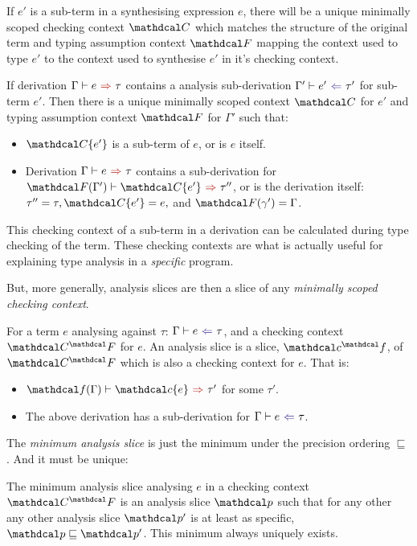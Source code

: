 If $e'$ is a sub-term in a synthesising expression $e$, there will be a unique minimally scoped checking context $\C$ which matches the structure of the original term and typing assumption context $\F$ mapping the context used to type $e'$ to the context used to synthesise $e'$ in it's checking context. 
\begin{proposition}
If derivation $\synthesis{e}{\tau}$ contains a analysis sub-derivation $\analysis[\Gamma']{e'}{\tau'}$ for sub-term $e'$. Then there is a unique minimally scoped context $\C$ for $e'$ and typing assumption context $\F$ for $\Gamma'$ such that:
\begin{itemize}
\item $\C\{e'\}$ is a sub-term of $e$, or is $e$ itself.
\item Derivation $\synthesis{e}{\tau}$ contains a sub-derivation for $\synthesis[\F(\Gamma')]{\C\{e'\}}{\tau''}$, or is the derivation itself: $\tau'' = \tau, \C\{e'\} = e,$ and $\F(\gamma') = \Gamma$.
\end{itemize}
\end{proposition}

This checking context of a sub-term in a derivation can be calculated during type checking of the term. These checking contexts are what is actually useful for explaining type analysis in a \textit{specific} program.

But, more generally, analysis slices are then a slice of any \textit{minimally scoped checking context}.

\begin{definition}\label{def:analysisslice}
For a term $e$ analysing against $\tau$: $\analysis{e}{\tau}$, and a checking context $\C^\F$ for $e$. An analysis slice is a slice, $\Cs^\f$, of $\C^\F$ which is also a checking context for $e$. That is:
\begin{itemize}
\item $\synthesis[\f(\Gamma)]{\Cs\{e\}}{\tau'}$ for some $\tau'$.
\item The above derivation has a sub-derivation for $\analysis{e}{\tau}$. 
\end{itemize}
\end{definition}

The \textit{minimum analysis slice} is just the minimum under the precision ordering $\sqsubseteq$. And it must be unique:

\begin{conjecture}\label{conj:AnalysisSliceUniqueness}
The minimum analysis slice analysing $e$ in a checking context $\C^\F$ is an analysis slice $\p$ such that for any other any other analysis slice $\p'$ is at least as specific, $\p \sqsubseteq \p'$. This minimum always uniquely exists.
\end{conjecture}

